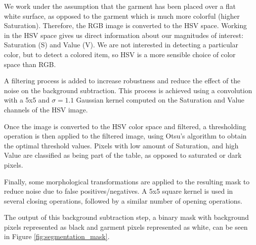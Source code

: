 We work under the assumption that the garment has been placed over a flat white surface, as opposed to the garment which is much more colorful (higher Saturation). Therefore, the RGB image is converted to the HSV space. Working in the HSV space gives us direct information about our magnitudes of interest: Saturation (S) and Value (V). We are not interested in detecting a particular color, but to detect a colored item, so HSV is a more sensible choice of color space than RGB. 

A filtering process is added to increase robustness and reduce the effect of the noise on the background subtraction. This process is achieved using a convolution with a 5x5 and $\sigma=1.1$ Gaussian kernel computed on the Saturation and Value channels of the HSV image.

Once the image is converted to the HSV color space and filtered, a thresholding operation is then applied to the filtered image, using Otsu's algorithm  to obtain the optimal threshold values. Pixels with low amount of Saturation, and high Value are classified as being part of the table, as opposed to saturated or dark pixels.

Finally, some morphological transformations are applied to the resulting mask to reduce noise due to false positives/negatives. A 5x5 square kernel is used in several closing operations, followed by a similar number of opening operations. 

The output of this background subtraction step, a binary mask with background pixels represented as black and garment pixels represented as white, can be seen in Figure \ref{fig:segmentation_mask}.


